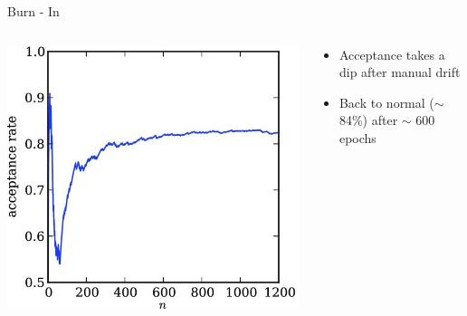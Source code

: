\documentclass[10pt]{beamer}
\begin{document}
\begin{frame}[fragile]{Burn - In}
\begin{columns}
\begin{column}{0.35\textwidth}
        \end{column}
    \end{columns}\pause
 \begin{columns}
 \begin{column}{0.35\textwidth} %
            \includegraphics[width=1\textwidth]{stt449fig3_half.jpeg}

        \end{column}
        \begin{column}{0.7\textwidth} %
        
        \begin{itemize}
            \item Acceptance takes a dip after manual drift
            \item Back to normal ($\sim$ 84\%) after $\sim$ 600 epochs
        \end{itemize}
        \end{column}
        
    \end{columns}


  
\end{frame}
\end{document}
